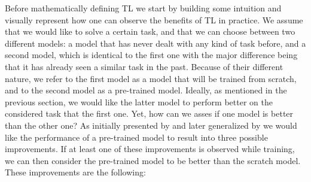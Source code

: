Before mathematically defining TL we start by building some intuition and visually represent how one can observe the benefits of TL in practice. We assume that we would like to solve a certain task, and that we can choose between two different models: a model that has never dealt with any kind of task before, and a second model, which is identical to the first one with the major difference being that it has already seen a similar task in the past. Because of their different nature, we refer to the first model as a model that will be trained from scratch, and to the second model as a pre-trained model. Ideally, as mentioned in the previous section, we would like the latter model to perform better on the considered task that the first one. Yet, how can we asses if one model is better than the other one? As initially presented by \citet{langley2006transfer} and later generalized by \citet{lazaric2012transfer} we would like the performance of a pre-trained model to result into three possible improvements. If at least one of these improvements is observed while training, we can then consider the pre-trained model to be better than the scratch model. These improvements are the following:
